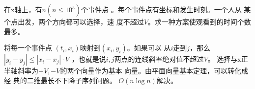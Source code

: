 \begin{prob}
	在x轴上，有$n(n\le 10^5)$个事件点
	。每个事件点有坐标和发生时刻。一个人从
	某个点出发，两个方向都可以选择，速
	度不超过$V$。求一种方案使观看到的时间个数最多。
\end{prob}

\begin{sol}
	将每一个事件点
	$(t_i,x_i)$映射到$(x_i,y_i)$。如果可以
	从$i$走到$j$，那么$|y_i-y_j| \le |x_i-x_j| \cdot V$
	，也就是说$i,j$两点的连线斜率绝对值不超过$V$。
	选择与x正半轴斜率为$+V,-V$的两个向量作为基本
	向量。由平面向量基本定理，可以转化成经
	典的二维最长不下降子序列问题。
	$O(n \log n)$解决。
\end{sol}
